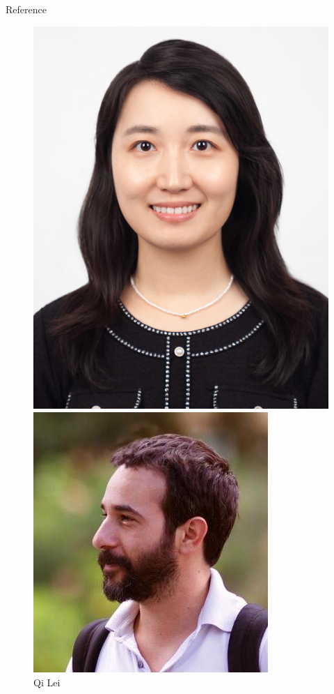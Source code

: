 \documentclass{beamer}
\begin{document}
\begin{frame}{Reference}
\begin{figure}
\begin{minipage}[t]{.2\paperwidth}
        \includegraphics[width=\textwidth]{res/Qi Lei.jpg}
        \caption{Qi Lei}
    \end{minipage}
    \begin{minipage}[t]{.2\paperwidth}
        \centering
        \includegraphics[width=\textwidth]{res/alexdimakis_sm.jpg}

\end{minipage}
\end{figure}
\end{frame}
\end{document}
